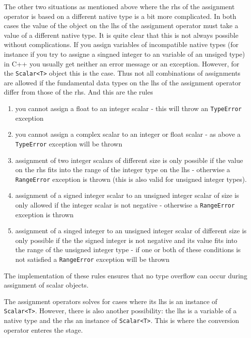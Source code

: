 The other two situations as mentioned above where the rhs of the assignment 
operator is based on a different native type is a bit more complicated. 
In both cases the value of the object on the lhs of the assignment operator 
must take a value of a different native type. It is quite clear that this is 
not always possible without complications. If you assign variables of 
incompatible native types (for instance if you try to assigne a singned integer
to an variable of an unsiged type) in C++ you usually get neither an error
message or an exception. However, for the {\tt Scalar<T>} object this is the 
case. Thus not all combinations of assignments are allowed if the fundamental 
data types on the lhs of the assignment operator differ from those of the 
rhs.
And this are the rules 
\begin{enumerate}
  \item you cannot assign a float to an integer scalar - this will throw an 
        {\tt TypeError} exception
  \item you cannot assign a complex scalar to an integer or float scalar - as 
        above a {\tt TypeError} exception will be thrown
  \item assignment of two integer scalars of different size is only possible 
        if the value on the rhs fits into the range of the integer type on the 
        lhs - otherwise a {\tt RangeError} exception is thrown (this is also 
        valid for unsigned integer types).
  \item assignment of a signed integer scalar to an unsigned integer scalar 
        of size is only allowed if the integer scalar is not negative - 
        otherwise a {\tt RangeError} exception is thrown 
  \item assignment of a singed integer to an unsigned integer scalar of
        different size is only possible if the the signed integer is not 
        negative and its value fits into the range of the unsigned integer 
        type - if one or both of these conditions is not satisfied a
        {\tt RangeError} exception will be thrown
\end{enumerate}
The implementation of these rules ensures that no type overflow can occur 
during assignment of scalar objects.

The assignment operators solves for cases where its lhs is an instance of 
{\tt Scalar<T>}. However, there is also another possibility: the lhs is a 
variable of a native type and the rhs an instance of {\tt Scalar<T>}.
This is where the conversion operator enteres the stage. 


